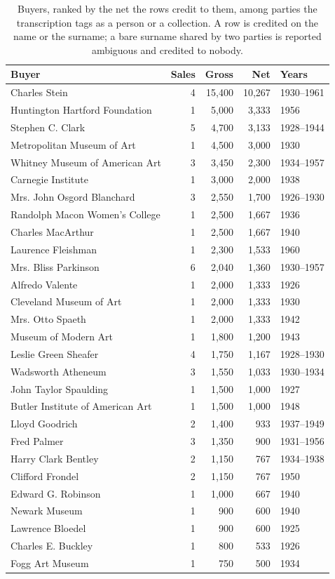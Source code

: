 \begin{table}[htbp]\centering\small
\caption{Buyers, ranked by the net the rows credit to them, among parties the transcription tags as a person or a collection. A row is credited on the name or the surname; a bare surname shared by two parties is reported ambiguous and credited to nobody.}\label{tab:buyers}
\begin{tabular}{lrrrl}\toprule Buyer & Sales & Gross & Net & Years\\\midrule
Charles Stein & 4 & 15,400 & 10,267 & 1930--1961\\
Huntington Hartford Foundation & 1 & 5,000 & 3,333 & 1956\\
Stephen C. Clark & 5 & 4,700 & 3,133 & 1928--1944\\
Metropolitan Museum of Art & 1 & 4,500 & 3,000 & 1930\\
Whitney Museum of American Art & 3 & 3,450 & 2,300 & 1934--1957\\
Carnegie Institute & 1 & 3,000 & 2,000 & 1938\\
Mrs. John Osgord Blanchard & 3 & 2,550 & 1,700 & 1926--1930\\
Randolph Macon Women's College & 1 & 2,500 & 1,667 & 1936\\
Charles MacArthur & 1 & 2,500 & 1,667 & 1940\\
Laurence Fleishman & 1 & 2,300 & 1,533 & 1960\\
Mrs. Bliss Parkinson & 6 & 2,040 & 1,360 & 1930--1957\\
Alfredo Valente & 1 & 2,000 & 1,333 & 1926\\
Cleveland Museum of Art & 1 & 2,000 & 1,333 & 1930\\
Mrs. Otto Spaeth & 1 & 2,000 & 1,333 & 1942\\
Museum of Modern Art & 1 & 1,800 & 1,200 & 1943\\
Leslie Green Sheafer & 4 & 1,750 & 1,167 & 1928--1930\\
Wadsworth Atheneum & 3 & 1,550 & 1,033 & 1930--1934\\
John Taylor Spaulding & 1 & 1,500 & 1,000 & 1927\\
Butler Institute of American Art & 1 & 1,500 & 1,000 & 1948\\
Lloyd Goodrich & 2 & 1,400 & 933 & 1937--1949\\
Fred Palmer & 3 & 1,350 & 900 & 1931--1956\\
Harry Clark Bentley & 2 & 1,150 & 767 & 1934--1938\\
Clifford Frondel & 2 & 1,150 & 767 & 1950\\
Edward G. Robinson & 1 & 1,000 & 667 & 1940\\
Newark Museum & 1 & 900 & 600 & 1940\\
Lawrence Bloedel & 1 & 900 & 600 & 1925\\
Charles E. Buckley & 1 & 800 & 533 & 1926\\
Fogg Art Museum & 1 & 750 & 500 & 1934\\
\bottomrule\end{tabular}\end{table}

